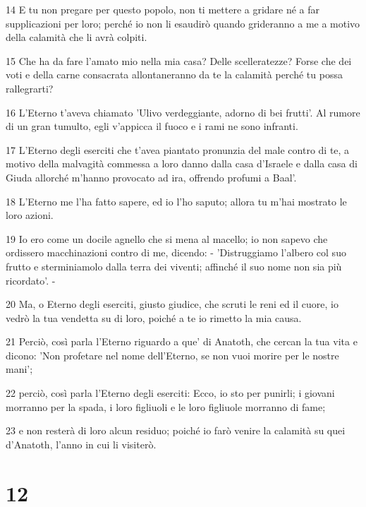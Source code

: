 \par 14 E tu non pregare per questo popolo, non ti mettere a gridare né a far supplicazioni per loro; perché io non li esaudirò quando grideranno a me a motivo della calamità che li avrà colpiti.
\par 15 Che ha da fare l'amato mio nella mia casa? Delle scelleratezze? Forse che dei voti e della carne consacrata allontaneranno da te la calamità perché tu possa rallegrarti?
\par 16 L'Eterno t'aveva chiamato 'Ulivo verdeggiante, adorno di bei frutti'. Al rumore di un gran tumulto, egli v'appicca il fuoco e i rami ne sono infranti.
\par 17 L'Eterno degli eserciti che t'avea piantato pronunzia del male contro di te, a motivo della malvagità commessa a loro danno dalla casa d'Israele e dalla casa di Giuda allorché m'hanno provocato ad ira, offrendo profumi a Baal'.
\par 18 L'Eterno me l'ha fatto sapere, ed io l'ho saputo; allora tu m'hai mostrato le loro azioni.
\par 19 Io ero come un docile agnello che si mena al macello; io non sapevo che ordissero macchinazioni contro di me, dicendo: - 'Distruggiamo l'albero col suo frutto e sterminiamolo dalla terra dei viventi; affinché il suo nome non sia più ricordato'. -
\par 20 Ma, o Eterno degli eserciti, giusto giudice, che scruti le reni ed il cuore, io vedrò la tua vendetta su di loro, poiché a te io rimetto la mia causa.
\par 21 Perciò, così parla l'Eterno riguardo a que' di Anatoth, che cercan la tua vita e dicono: 'Non profetare nel nome dell'Eterno, se non vuoi morire per le nostre mani';
\par 22 perciò, così parla l'Eterno degli eserciti: Ecco, io sto per punirli; i giovani morranno per la spada, i loro figliuoli e le loro figliuole morranno di fame;
\par 23 e non resterà di loro alcun residuo; poiché io farò venire la calamità su quei d'Anatoth, l'anno in cui li visiterò.

\chapter{12}

